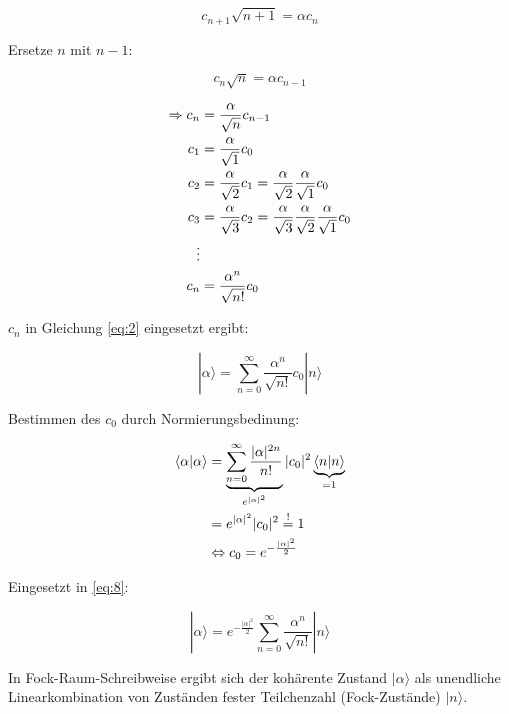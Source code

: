 \begin{equation}
  \label{eq:5}
  c_{n+1}\sqrt{n+1} = \alpha c_n
\end{equation}

Ersetze \(n\) mit \(n-1\):

\begin{equation}
  \label{eq:6}
  c_n\sqrt{n} = \alpha c_{n-1}
\end{equation}

\begin{align}
  \label{eq:7}
  \Rightarrow c_n &= \frac{\alpha}{\sqrt{n}}c_{n-1} \notag\\
c_1 &=  \frac{\alpha}{\sqrt{1}}c_{0} \notag\\
c_2 &=  \frac{\alpha}{\sqrt{2}}c_{1} =\frac{\alpha}{\sqrt{2}}\frac{\alpha}{\sqrt{1}}c_{0}  \notag \\
c_3 &=  \frac{\alpha}{\sqrt{3}}c_{2} =  \frac{\alpha}{\sqrt{3}} \frac{\alpha}{\sqrt{2}}\frac{\alpha}{\sqrt{1}}c_{0}  \notag\\
\vdots \notag\\
c_n &=  \frac{\alpha^n}{\sqrt{n!}}c_{0}
\end{align}

\(c_n\) in Gleichung \eqref{eq:2} eingesetzt ergibt:

\begin{equation}
  \label{eq:8}
  |\alpha\rangle =\sum_{n=0}^{\infty} \frac{\alpha^n}{\sqrt{n!}}c_0 |n\rangle 
\end{equation}

Bestimmen des \(c_0\) durch Normierungsbedinung:

\begin{align}
  \label{eq:9}
  \langle \alpha | \alpha \rangle  &= \underbrace{\sum_{n=0}^{\infty} \frac{|\alpha|^{2n}}{n!}}_{e^{|\alpha|^2}} |c_0|^2 \underbrace{\langle n|n\rangle}_{=1} \notag\\
&= e^{|\alpha|^2}|c_0|^2 \stackrel{!}= 1 \notag \\
 &\Leftrightarrow c_0 = e^{-\frac{|\alpha|^2}{2}} 
\end{align}

Eingesetzt in \eqref{eq:8}:

\begin{equation}
  \label{eq:10}
  \boxed{ |\alpha\rangle =  e^{-\frac{|\alpha|^2}{2}} \sum_{n=0}^{\infty} \frac{\alpha^n}{\sqrt{n!}} |n\rangle }
\end{equation}

In Fock-Raum-Schreibweise ergibt sich der kohärente Zustand \(|\alpha\rangle\) als unendliche Linearkombination von Zuständen fester Teilchenzahl (Fock-Zustände) \(|n\rangle\).


